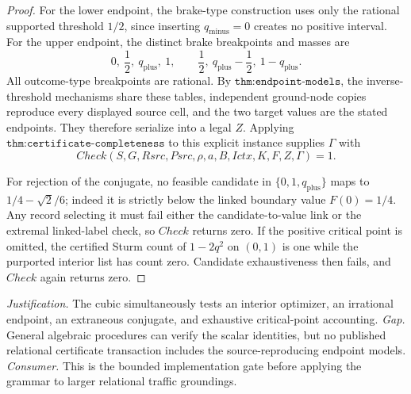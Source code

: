 \documentclass{article}
\begin{document}
\begin{proof}
For the lower endpoint, the brake-type construction uses only the rational supported threshold \(1/2\), since inserting \(q_{\mathrm{minus}}=0\) creates no positive interval.  For the upper endpoint, the distinct brake breakpoints and masses are
\[
 0,\ \frac12,\ q_{\mathrm{plus}},\ 1,
 \qquad
 \frac12,\ q_{\mathrm{plus}}-\frac12,\ 1-q_{\mathrm{plus}}.
\]
All outcome-type breakpoints are rational.  By \(\texttt{thm:endpoint-models}\), the inverse-threshold mechanisms share these tables, independent ground-node copies reproduce every displayed source cell, and the two target values are the stated endpoints.  They therefore serialize into a legal \(Z\).  Applying \(\texttt{thm:certificate-completeness}\) to this explicit instance supplies \(\Gamma\) with
\[
 Check(S,G,Rsrc,Psrc,\rho,a,B,Ictx,K,F,Z,\Gamma)=1.
\]

For rejection of the conjugate, no feasible candidate in \(\{0,1,q_{\mathrm{plus}}\}\) maps to \(1/4-\sqrt2/6\); indeed it is strictly below the linked boundary value \(F(0)=1/4\).  Any record selecting it must fail either the candidate-to-value link or the extremal linked-label check, so \(Check\) returns zero.  If the positive critical point is omitted, the certified Sturm count of \(1-2q^2\) on \((0,1)\) is one while the purported interior list has count zero.  Candidate exhaustiveness then fails, and \(Check\) again returns zero.
\end{proof}
\par\smallskip\noindent \textit{Justification.} The cubic simultaneously tests an interior optimizer, an irrational endpoint, an extraneous conjugate, and exhaustive critical-point accounting. \textit{Gap.} General algebraic procedures can verify the scalar identities, but no published relational certificate transaction includes the source-reproducing endpoint models. \textit{Consumer.} This is the bounded implementation gate before applying the grammar to larger relational traffic groundings.
\end{document}

